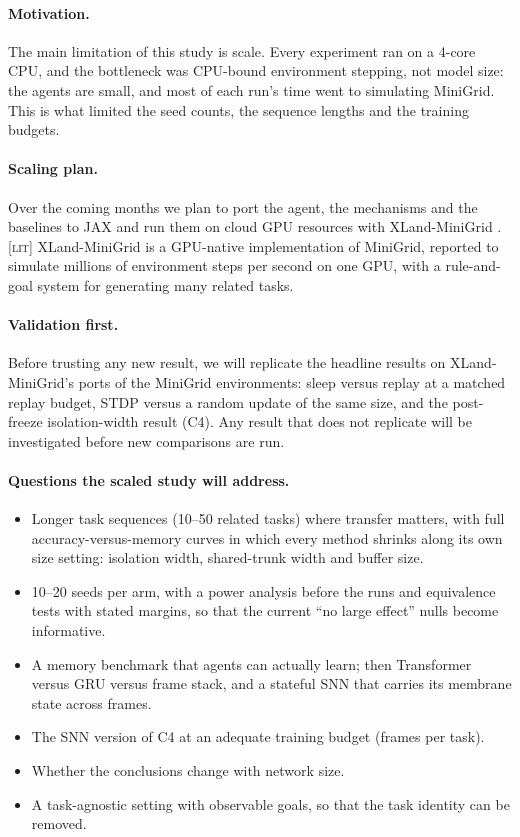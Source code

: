 \documentclass[10pt]{article}
\newcommand{\lit}{\textsc{[lit]}\xspace}
\begin{document}
\paragraph{Motivation.} The main limitation of this study is scale. Every experiment ran on a 4-core CPU, and the
bottleneck was CPU-bound environment stepping, not model size: the agents are small, and most of each run's time went
to simulating MiniGrid. This is what limited the seed counts, the sequence lengths and the training budgets.

\paragraph{Scaling plan.} Over the coming months we plan to port the agent, the mechanisms and the baselines to JAX
and run them on cloud GPU resources with XLand-MiniGrid \citep{nikulin2024xland}. \lit XLand-MiniGrid is a GPU-native
implementation of MiniGrid, reported to simulate millions of environment steps per second on one GPU, with a
rule-and-goal system for generating many related tasks.

\paragraph{Validation first.} Before trusting any new result, we will replicate the headline results on
XLand-MiniGrid's ports of the MiniGrid environments: sleep versus replay at a matched replay budget, STDP versus a
random update of the same size, and the post-freeze isolation-width result (C4). Any result that does not replicate will
be investigated before new comparisons are run.

\paragraph{Questions the scaled study will address.}
\begin{itemize}
  \item Longer task sequences (10--50 related tasks) where transfer matters, with full accuracy-versus-memory curves in
        which every method shrinks along its own size setting: isolation width, shared-trunk width and buffer size.
  \item 10--20 seeds per arm, with a power analysis before the runs and equivalence tests with stated margins, so that
        the current ``no large effect'' nulls become informative.
  \item A memory benchmark that agents can actually learn; then Transformer versus GRU versus frame stack, and a
        stateful SNN that carries its membrane state across frames.
  \item The SNN version of C4 at an adequate training budget (\framesPerTaskFiveFair frames per task).
  \item Whether the conclusions change with network size.
  \item A task-agnostic setting with observable goals, so that the task identity can be removed.
\end{itemize}
\end{document}
